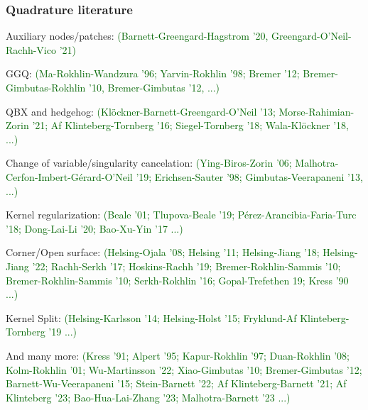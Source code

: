 \documentclass[t]{beamer}
\newcommand{\ft}[1]{\frametitle{#1}}
\newcommand{\who}[1]{{\scriptsize \textcolor{darkgreen}{(#1)}}}  %
\begin{document}
\begin{noframe}\ft{Quadrature literature}

{\scriptsize Auxiliary nodes/patches:} \who{Barnett-Greengard-Hagstrom '20, Greengard-O'Neil-Rachh-Vico '21}

{\scriptsize GGQ:} \who{Ma-Rokhlin-Wandzura '96; Yarvin-Rokhlin '98; Bremer '12; Bremer-Gimbutas-Rokhlin '10, Bremer-Gimbutas '12, ...}
        
{\scriptsize QBX and hedgehog:} \who{Kl\"ockner-Barnett-Greengard-O'Neil '13; Morse-Rahimian-Zorin '21; Af Klinteberg-Tornberg '16; Siegel-Tornberg '18; Wala-Kl\"ockner '18, ...}
  
{\scriptsize Change of variable/singularity cancelation:} \who{Ying-Biros-Zorin '06; Malhotra-Cerfon-Imbert-G\'erard-O'Neil '19; Erichsen-Sauter '98; Gimbutas-Veerapaneni '13, ...}

{\scriptsize Kernel regularization:} \who{Beale '01; Tlupova-Beale '19; P\'erez-Arancibia-Faria-Turc '18; Dong-Lai-Li '20; Bao-Xu-Yin '17 ...}

{\scriptsize Corner/Open surface:} \who{Helsing-Ojala '08; Helsing '11; Helsing-Jiang '18; Helsing-Jiang '22; Rachh-Serkh '17; Hoskins-Rachh '19; Bremer-Rokhlin-Sammis '10; Bremer-Rokhlin-Sammis '10; Serkh-Rokhlin '16; Gopal-Trefethen 19; Kress '90 ...}

{\scriptsize Kernel Split:} \who{Helsing-Karlsson '14; Helsing-Holst '15; Fryklund-Af Klinteberg-Tornberg '19 ...} 
        
{\scriptsize And many more}: \who{Kress '91; Alpert '95; Kapur-Rokhlin '97; Duan-Rokhlin '08; Kolm-Rokhlin '01; Wu-Martinsson '22; Xiao-Gimbutas '10; Bremer-Gimbutas '12; Barnett-Wu-Veerapaneni '15; Stein-Barnett '22; Af Klinteberg-Barnett '21; Af Klinteberg '23; Bao-Hua-Lai-Zhang '23; Malhotra-Barnett '23 ...}

\end{noframe}
\end{document}
